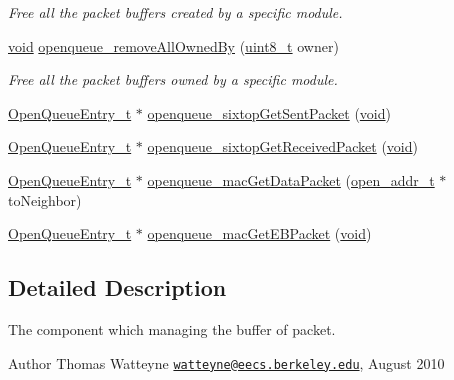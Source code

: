 \begin{DoxyCompactItemize}
\begin{DoxyCompactList}\small\item\em Free all the packet buffers created by a specific module. \end{DoxyCompactList}\item 
\hyperlink{usb__devapi_8h_afabf60e7f57651d6d595a02c75f07cd0}{void} \hyperlink{group___open_queue_gab4a47e0afad6ca760d6dbef15787ee10}{openqueue\+\_\+remove\+All\+Owned\+By} (\hyperlink{_p_e___types_8h_aba7bc1797add20fe3efdf37ced1182c5}{uint8\+\_\+t} owner)
\begin{DoxyCompactList}\small\item\em Free all the packet buffers owned by a specific module. \end{DoxyCompactList}\item 
\hyperlink{struct_open_queue_entry__t}{Open\+Queue\+Entry\+\_\+t} $\ast$ \hyperlink{group___open_queue_ga40c24137e491056f44eea45ca961b7b4}{openqueue\+\_\+sixtop\+Get\+Sent\+Packet} (\hyperlink{usb__devapi_8h_afabf60e7f57651d6d595a02c75f07cd0}{void})
\item 
\hyperlink{struct_open_queue_entry__t}{Open\+Queue\+Entry\+\_\+t} $\ast$ \hyperlink{group___open_queue_ga55dc6c059910d2d78d188f2d776bc257}{openqueue\+\_\+sixtop\+Get\+Received\+Packet} (\hyperlink{usb__devapi_8h_afabf60e7f57651d6d595a02c75f07cd0}{void})
\item 
\hyperlink{struct_open_queue_entry__t}{Open\+Queue\+Entry\+\_\+t} $\ast$ \hyperlink{group___open_queue_ga654ff57cc43c12704d87dc66fcfe7fa2}{openqueue\+\_\+mac\+Get\+Data\+Packet} (\hyperlink{structopen__addr__t}{open\+\_\+addr\+\_\+t} $\ast$to\+Neighbor)
\item 
\hyperlink{struct_open_queue_entry__t}{Open\+Queue\+Entry\+\_\+t} $\ast$ \hyperlink{group___open_queue_ga937a90da5389299afbcaeb06311b0041}{openqueue\+\_\+mac\+Get\+E\+B\+Packet} (\hyperlink{usb__devapi_8h_afabf60e7f57651d6d595a02c75f07cd0}{void})
\end{DoxyCompactItemize}


\subsection{Detailed Description}
The component which managing the buffer of packet. 

\begin{DoxyAuthor}{Author}
Thomas Watteyne \href{mailto:watteyne@eecs.berkeley.edu}{\tt watteyne@eecs.\+berkeley.\+edu}, August 2010 
\end{DoxyAuthor}


